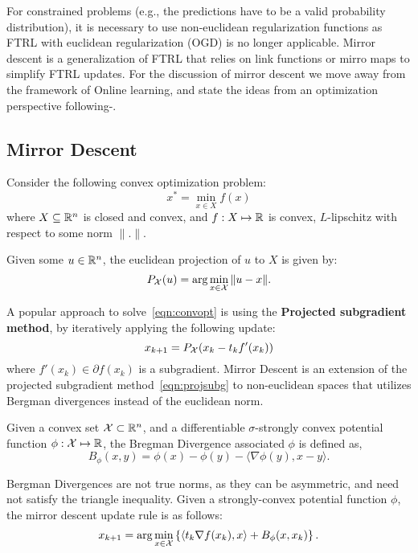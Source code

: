 For constrained problems (e.g., the predictions have to be a valid probability distribution), it is
necessary to use non-euclidean regularization functions as FTRL with euclidean regularization (OGD)
is no longer applicable.
Mirror descent is a generalization of FTRL that relies on link functions or mirro maps to simplify
FTRL updates.
For the discussion of mirror descent we move away from the framework of Online learning, and state
the ideas from an optimization perspective following-\cite{beckMirror2003a,beckFirstOrder2017}.

\subsection{Mirror Descent}
Consider the following convex optimization problem:
\begin{equation}
	\label{eqn:convopt} x^{\ast} =
	\min_{x \in X} f(x)
\end{equation} where $X \subseteq \mathbb{R}^n$ is closed and convex, and $f: X \mapsto
	\mathbb{R}$ is convex, $L$-lipschitz with respect to some norm $\|.
	\|$.

Given some $u \in \mathbb{R}^n$, the euclidean projection of $u$ to $X$ is given by:
\begin{equation}
	\label{eqn:eucproj} P_{\mathcal{X}}(u) = \arg \min_{x \in \mathcal{X}} \| u - x \|.
\end{equation}

A popular approach to solve~\ref{eqn:convopt} is using the \textbf{Projected subgradient method},
by iteratively applying the following update:
\begin{equation}
	\label{eqn:projsubg} x_{k+1} =
	P_{\mathcal{X}}(x_k - t_k f'(x_k))
\end{equation} where $f'(x_k) \in \partial f(x_k)$ is a subgradient.
Mirror Descent is an extension of the projected subgradient method~\ref{eqn:projsubg} to
non-euclidean spaces that utilizes Bergman divergences instead of the euclidean norm.

\begin{definition}
	\label{def:bregman}
	Given a convex set $\mathcal{X} \subset \mathbb{R}^n$, and a differentiable $\sigma$-strongly convex potential
	function $\phi: \mathcal{X} \mapsto \mathbb{R}$, the Bregman Divergence associated $\phi$ is defined as, $$
		B_\phi(x, y) = \phi(x) - \phi(y) - \langle \nabla \phi(y), x-y \rangle.
	$$
\end{definition}

Bergman Divergences are not true norms, as they can be asymmetric, and need not satisfy the
triangle inequality.
Given a strongly-convex potential function $\phi$, the mirror descent update rule is as follows:
\begin{equation}
	x_{k+1} = \arg \min_{x \in \mathcal{X}} \left \{ \left \langle t_k \nabla f(x_k), x
	\right \rangle + B_\phi(x, x_k) \right \}.
\end{equation}

